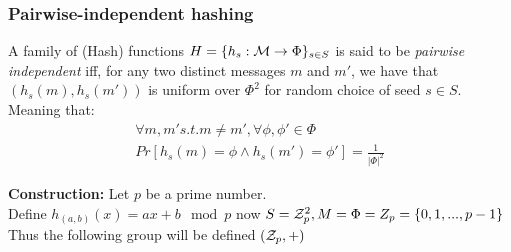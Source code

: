 \subsubsection{Pairwise-independent hashing}

\begin{definition}
    A family of (Hash) functions $H=\{h_s:\mathcal{M} \to \Phi\}_{s\in S}$ is said to be \emph{pairwise independent} iff, for any two distinct messages $m$ and $m'$, we have that $(h_s(m),h_s(m'))$ is uniform over $\Phi^2$ for random choice of seed $s \in S$. Meaning that:
    \begin{gather*}
        \forall m,m' s.t. m\neq m',\forall \phi,\phi' \in \Phi \\
        Pr[h_s(m)=\phi \wedge h_s(m')=\phi']=\frac{1}{|\Phi|^2}
    \end{gather*}
\end{definition}

\textbf{Construction: } Let $p$ be a prime number.\\
Define $h_{(a,b)}(x)=ax+b \mod p$ now $S=\mathcal{Z}_p^2, M=\Phi=Z_p=\{0,1,...,p-1\}$
Thus the following group will be defined $(\mathcal{Z}_p,+)$

